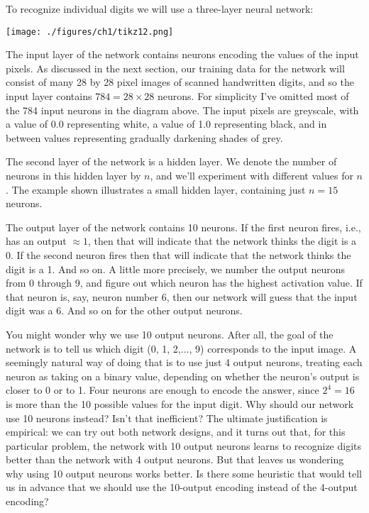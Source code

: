 \documentclass[a4paper,twoside,10pt]{book}
\begin{document}
To recognize individual digits we will use a three-layer neural network:
\begin{center}
	\texttt{[image: ./figures/ch1/tikz12.png]}
\end{center}
The input layer of the network contains neurons encoding the values of the input pixels. As discussed in the next section, our training data for the network will consist of many 28 by 28 pixel images of scanned handwritten digits, and so the input layer contains $784=28\times28$ neurons. For simplicity I've omitted most of the 784 input neurons in the diagram above. The input pixels are greyscale, with a value of 0.0 representing white, a value of 1.0 representing black, and in between values representing gradually darkening shades of grey.

The second layer of the network is a hidden layer. We denote the number of neurons in this hidden layer by $n$, and we'll experiment with different values for $n$. The example shown illustrates a small hidden layer, containing just $n=15$ neurons.

The output layer of the network contains 10 neurons. If the first neuron fires, i.e., has an output $\approx 1$, then that will indicate that the network thinks the digit is a 0. If the second neuron fires then that will indicate that the network thinks the digit is a 1. And so on. A little more precisely, we number the output neurons from 0 through 9, and figure out which neuron has the highest activation value. If that neuron is, say, neuron number 6, then our network will guess that the input digit was a 6. And so on for the other output neurons.

You might wonder why we use 10 output neurons. After all, the goal of the network is to tell us which digit (0, 1, 2,$\ldots$, 9) corresponds to the input image. A seemingly natural way of doing that is to use just 4 output neurons, treating each neuron as taking on a binary value, depending on whether the neuron's output is closer to 0 or to 1. Four neurons are enough to encode the answer, since $2^4=16$ is more than the 10 possible values for the input digit. Why should our network use 10 neurons instead? Isn't that inefficient? The ultimate justification is empirical: we can try out both network designs, and it turns out that, for this particular problem, the network with 10 output neurons learns to recognize digits better than the network with 4 output neurons. But that leaves us wondering why using 10 output neurons works better. Is there some heuristic that would tell us in advance that we should use the 10-output encoding instead of the 4-output encoding?
\end{document}
